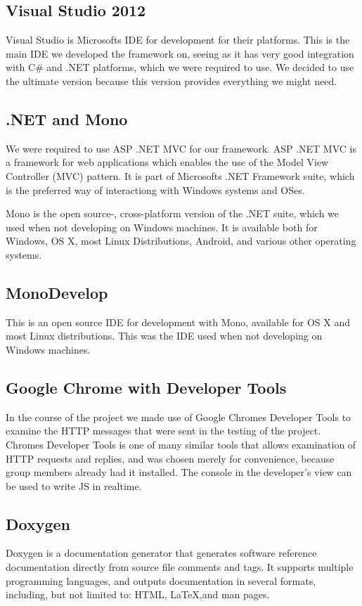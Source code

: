 \subsection{Visual Studio 2012}
Visual Studio is Microsofts IDE for development for their platforms. This is the main IDE we developed the framework on, seeing as it has very good integration with C\# and .NET platforms, which we were required to use. We decided to use the ultimate version because this version provides everything we might need.

\subsection{.NET and Mono}
We were required to use ASP .NET MVC for our framework. ASP .NET MVC is a framework for web applications which enables the use of the Model View Controller (MVC) pattern. It is part of Microsofts .NET Framework suite, which is the preferred way of interactiong with Windows systems and OSes.

Mono is the open source-, cross-platform version of the .NET suite, which we used when not developing on Windows machines. It is available both for Windows, OS X, most Linux Distributions, Android, and various other operating systems.

\subsection{MonoDevelop}
This is an open source IDE for development with Mono, available for OS X and most Linux distributions. This was the IDE used when not developing on Windows machines.

\subsection{Google Chrome with Developer Tools}
In the course of the project we made use of Google Chromes Developer Tools to examine the HTTP messages that were sent in the testing of the project. Chromes Developer Tools is one of many similar tools that allows examination of HTTP requests and replies, and was chosen merely for convenience, because group members already had it installed. The console in the developer's view can be used to write JS in realtime.

\subsection{Doxygen}
Doxygen is a documentation generator that generates software reference documentation directly from source file comments and tags. It supports multiple programming languages, and outputs documentation in several formats, including, but not limited to: HTML, {LaTeX},and man pages.

